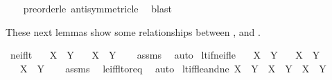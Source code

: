 \begin{isabellebody}
%
\isadelimproof
\ \ %
\endisadelimproof
%
\isatagproof
{}\isamarkupfalse%
\ preorder{\isacharunderscore}{\kern0pt}le\ antisymmetric{\isacharunderscore}{\kern0pt}le\ \isamarkupfalse%
\ blast%
\endisatagproof
{\isafoldproof}%
%
\isadelimproof
%
\endisadelimproof
%
\begin{isamarkuptext}%
These next lemmas show some relationships between \isa{{\isacharparenleft}{\kern0pt}{\isacharless}{\kern0pt}{\isacharparenright}{\kern0pt}}, \isa{{\isacharparenleft}{\kern0pt}{\isasymle}{\isacharparenright}{\kern0pt}} and
\isa{{\isacharparenleft}{\kern0pt}{\isacharequal}{\kern0pt}{\isacharparenright}{\kern0pt}}.%
\end{isamarkuptext}\isamarkuptrue%
\isamarkupfalse%
\ ne{\isacharunderscore}{\kern0pt}if{\isacharunderscore}{\kern0pt}lt{\isacharcolon}{\kern0pt}\isanewline
\ \ \ {\isachardoublequoteopen}X\ {\isacharless}{\kern0pt}\ Y{\isachardoublequoteclose}\isanewline
\ \ \ {\isachardoublequoteopen}X\ {\isasymnoteq}\ Y{\isachardoublequoteclose}\isanewline
%
\isadelimproof
\ \ %
\endisadelimproof
%
\isatagproof
{}\isamarkupfalse%
\ assms\ \isamarkupfalse%
\ auto%
\endisatagproof
{\isafoldproof}%
%
\isadelimproof
\isanewline
%
\endisadelimproof
\isanewline
{}\isamarkupfalse%
\ lt{\isacharunderscore}{\kern0pt}if{\isacharunderscore}{\kern0pt}ne{\isacharunderscore}{\kern0pt}if{\isacharunderscore}{\kern0pt}le{\isacharcolon}{\kern0pt}\isanewline
\ \ \ {\isachardoublequoteopen}X\ {\isasymle}\ Y{\isachardoublequoteclose}\isanewline
\ \ \ {\isachardoublequoteopen}X\ {\isasymnoteq}\ Y{\isachardoublequoteclose}\isanewline
\ \ \ {\isachardoublequoteopen}X\ {\isacharless}{\kern0pt}\ Y{\isachardoublequoteclose}\isanewline
%
\isadelimproof
\ \ %
\endisadelimproof
%
\isatagproof
{}\isamarkupfalse%
\ assms\ \isamarkupfalse%
\ le{\isacharunderscore}{\kern0pt}iff{\isacharunderscore}{\kern0pt}lt{\isacharunderscore}{\kern0pt}or{\isacharunderscore}{\kern0pt}eq\ \isamarkupfalse%
\ auto%
\endisatagproof
{\isafoldproof}%
%
\isadelimproof
\isanewline
%
\endisadelimproof
\isanewline
{}\isamarkupfalse%
\ lt{\isacharunderscore}{\kern0pt}iff{\isacharunderscore}{\kern0pt}le{\isacharunderscore}{\kern0pt}and{\isacharunderscore}{\kern0pt}ne{\isacharcolon}{\kern0pt}\ {\isachardoublequoteopen}X\ {\isacharless}{\kern0pt}\ Y\ {\isasymlongleftrightarrow}\ X\ {\isasymle}\ Y\ {\isasymand}\ X\ {\isasymnoteq}\ Y{\isachardoublequoteclose}\isanewline

\end{isabellebody}
